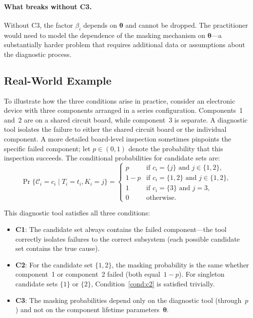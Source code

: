 \documentclass[11pt]{article}
\theoremstyle{definition}
\theoremstyle{plain}
\renewcommand{\v}[1]{\boldsymbol{#1}}
\newcommand{\btheta}{\v{\theta}}
\begin{document}
\paragraph{What breaks without C3.}
Without C3, the factor $\beta_i$ depends on $\btheta$ and cannot be
dropped.
The practitioner would need to model the dependence of the masking
mechanism on $\btheta$---a substantially harder problem that requires
additional data or assumptions about the diagnostic process.

\subsection{Real-World Example}
\label{sec:real-world-example}

To illustrate how the three conditions arise in practice, consider an
electronic device with three components arranged in a series
configuration.
Components~1 and~2 are on a shared circuit board, while component~3 is
separate.
A diagnostic tool isolates the failure to either the shared circuit
board or the individual component.
A more detailed board-level inspection sometimes pinpoints the specific
failed component; let $p \in (0,1)$ denote the probability that this
inspection succeeds.
The conditional probabilities for candidate sets are:
\[
\Pr\{\mathcal{C}_i = c_i \mid T_i = t_i, K_i = j\}
= \begin{cases}
    p   & \text{if } c_i = \{j\} \text{ and } j \in \{1, 2\}, \\
    1-p & \text{if } c_i = \{1, 2\} \text{ and } j \in \{1, 2\}, \\
    1   & \text{if } c_i = \{3\} \text{ and } j = 3, \\
    0   & \text{otherwise.}
\end{cases}
\]

This diagnostic tool satisfies all three conditions:
\begin{itemize}
    \item \textbf{C1}: The candidate set always contains the failed
    component---the tool correctly isolates failures to the correct
    subsystem (each possible candidate set contains the true cause).
    \item \textbf{C2}: For the candidate set $\{1, 2\}$, the masking
    probability is the same whether component~1 or component~2 failed
    (both equal~$1-p$).
    For singleton candidate sets $\{1\}$ or $\{2\}$,
    Condition~\ref{cond:c2} is satisfied trivially.
    \item \textbf{C3}: The masking probabilities depend only on the
    diagnostic tool (through~$p$) and not on the component lifetime
    parameters~$\btheta$.
\end{itemize}
\end{document}
